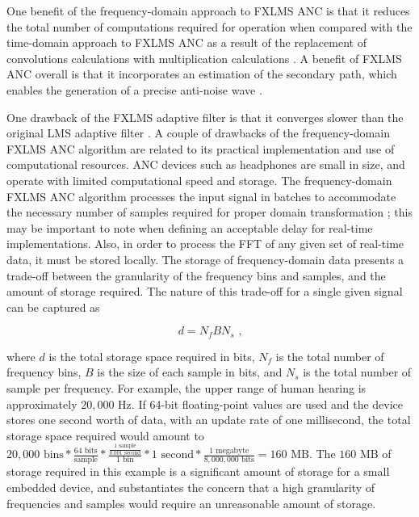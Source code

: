 \documentclass[11pt, letterpaper]{article}
\numberwithin{equation}{section}
\begin{document}
One benefit of the frequency-domain approach to FXLMS ANC is that it reduces the total number of computations required for operation when compared with the time-domain approach to FXLMS ANC as a result of the replacement of convolutions calculations with multiplication calculations \cite{kuo}. A benefit of FXLMS ANC overall is that it incorporates an estimation of the secondary path, which enables the generation of a precise anti-noise wave \cite{gaur}.

One drawback of the FXLMS adaptive filter is that it converges slower than the original LMS adaptive filter \cite{gaur}. A couple of drawbacks of the frequency-domain FXLMS ANC algorithm are related to its practical implementation and use of computational resources. ANC devices such as headphones are small in size, and operate with limited computational speed and storage. The frequency-domain FXLMS ANC algorithm processes the input signal in batches to accommodate the necessary number of samples required for proper domain transformation \cite{kuo}; this may be important to note when defining an acceptable delay for real-time implementations. Also, in order to process the FFT of any given set of real-time data, it must be stored locally. The storage of frequency-domain data presents a trade-off between the granularity of the frequency bins and samples, and the amount of storage required. The nature of this trade-off for a single given signal can be captured as

 \begin{equation}
     d = N_f B N_s \text{ ,}
 \end{equation}

where $d$ is the total storage space required in bits, $N_f$ is the total number of frequency bins, $B$ is the size of each sample in bits, and $N_s$ is the total number of sample per frequency. For example, the upper range of human hearing is approximately $20,000$ Hz. If 64-bit floating-point values are used and the device stores one second worth of data, with an update rate of one millisecond, the total storage space required would amount to $20,000 \text{ bins} * \frac{64 \text{ bits}}{\text{sample}} * \frac{\frac{1 \text{ sample}}{0.001 \text{ second}}}{1 \text{ bin}} * 1 \text{ second} * \frac{1 \text{ megabyte}}{8,000,000 \text{ bits}} = 160 \text{ MB}$. The $160$ MB of storage required in this example is a significant amount of storage for a small embedded device, and substantiates the concern that a high granularity of frequencies and samples would require an unreasonable amount of storage.
\end{document}
